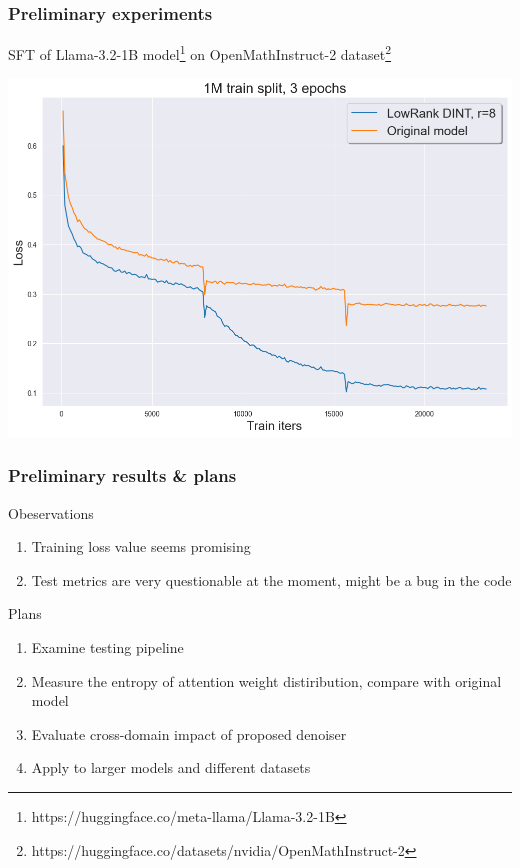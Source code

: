 \documentclass[10pt]{beamer}
\begin{document}
\begin{frame}
    \frametitle{Preliminary experiments}

    SFT of Llama-3.2-1B model\footnote{https://huggingface.co/meta-llama/Llama-3.2-1B} on OpenMathInstruct-2 dataset\footnote{https://huggingface.co/datasets/nvidia/OpenMathInstruct-2}
    \begin{center}
        \includegraphics[scale=0.35]{../images/Loss_1M_3epochs.png}
    \end{center}
        
\end{frame}

\begin{frame}
    \frametitle{Preliminary results \& plans}
    \begin{block}{Obeservations}
        \begin{enumerate}
            \item Training loss value seems promising
            \item Test metrics are very questionable at the moment, might be a bug in the code
        \end{enumerate}
    \end{block}
    \begin{block}{Plans}
        \begin{enumerate}
            \item Examine testing pipeline
            \item Measure the entropy of attention weight distiribution, compare with original model
            \item Evaluate cross-domain impact of proposed denoiser
            \item Apply to larger models and different datasets
        \end{enumerate}
    \end{block}
\end{frame}
\end{document}
